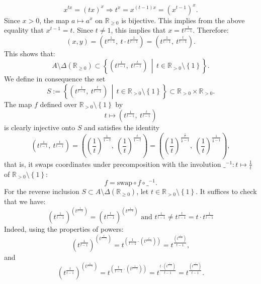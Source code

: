 \begin{solution}
    \[
        x^{t x} = \left(t x\right)^x \Rightarrow t^x = x^{\left(t - 1\right)x} = \left(x^{t - 1}\right)^x.
    \]
    Since \( x > 0 \), the map \( a \mapsto a^x \) on \( \mathbb{R}_{\geq 0} \) is bijective. This implies from the above equality that \( x^{t - 1} = t \). Since \( t \neq 1 \), this implies that \( x = t^{\frac{1}{t - 1}} \). Therefore:
    \[
        \left(x,y\right) = \left(t^{\frac{1}{t - 1}},\ t \cdot t^{\frac{1}{t - 1}}\right) = \left(t^{\frac{1}{t - 1}},\ t^{\frac{t}{t - 1}}\right).
    \]
    This shows that:
    \[
        A \setminus \Delta\left(\mathbb{R}_{\geq 0}\right) \subset \left\{ \left(t^{\frac{1}{t - 1}},\ t^{\frac{t}{t - 1}} \right) \,\middle|\, t \in \mathbb{R}_{> 0} \setminus \left\{1\right\} \right\}.
    \]
    We define in consequence the set
    \[
        S := \left\{ \left(t^{\frac{1}{t - 1}},\ t^{\frac{t}{t - 1}} \right) \,\middle|\, t \in \mathbb{R}_{>0} \setminus \left\{1\right\} \right\} \subset \mathbb{R}_{> 0} \times \mathbb{R}_{> 0}.
    \]
    The map \( f \) defined over \( \mathbb{R}_{>0} \setminus \left\{1\right\} \) by
    \[
        t \mapsto \left(t^{\frac{1}{t - 1}},\ t^{\frac{t}{t - 1}} \right)
    \]
    is clearly injective onto \( S \) and satisfies the identity
    \[
        \left(t^{\frac{1}{t - 1}},\ t^{\frac{t}{t - 1}} \right) = \left(\left( \frac{1}{t} \right)^{\frac{1}{1 - t}},\ \left( \frac{1}{t} \right)^{\frac{t}{1 - t}} \right) = \left( \left( \frac{1}{t} \right)^{\frac{\frac{1}{t}}{\frac{1}{t} - 1}},\ \left( \frac{1}{t} \right)^{\frac{1}{\frac{1}{t} - 1}} \right),
    \]
    that is, it swaps coordinates under precomposition with the involution \( \_^{-1}: t \mapsto \frac{1}{t} \) of \( \mathbb{R}_{>0} \setminus \left\{1\right\} \):
    \[
        f = \mathrm{swap} \circ f\circ\_^{-1}.
    \]
    For the reverse inclusion \( S \subset A \setminus \Delta\left(\mathbb{R}_{\geq 0}\right) \), let \( t \in \mathbb{R}_{> 0} \setminus \left\{1\right\} \). It suffices to check that we have:
    \[
        \left(t^{\frac{1}{t-1}}\right)^{\left(t^{\frac{t}{t-1}}\right)}=\left(t^{\frac{t}{t-1}}\right)^{\left(t^{\frac{1}{t-1}}\right)} \text{ and } t^{\frac{1}{t-1}} \neq t^{\frac{t}{t-1}}=t\cdot t^{\frac{1}{t-1}}
    \]
    Indeed, using the properties of powers:
    \[
        \left(t^{\frac{1}{t-1}}\right)^{\left(t^{\frac{t}{t-1}}\right)} = t^{\left(\frac{1}{t-1} \cdot \left(t^{\frac{t}{t-1}}\right)\right)} = t^{\frac{\left(t^{\frac{t}{t-1}}\right)}{t-1}},
    \]
    and
    \[
        \left(t^{\frac{t}{t-1}}\right)^{\left(t^{\frac{1}{t-1}}\right)} = t^{\left(\frac{t}{t-1} \cdot \left(t^{\frac{1}{t-1}}\right)\right)} = t^{\frac{t \cdot \left(t^{\frac{1}{t-1}}\right)}{t-1}} = t^{\frac{\left(t^{\frac{t}{t-1}}\right)}{t-1}}.
\]
\end{solution}
